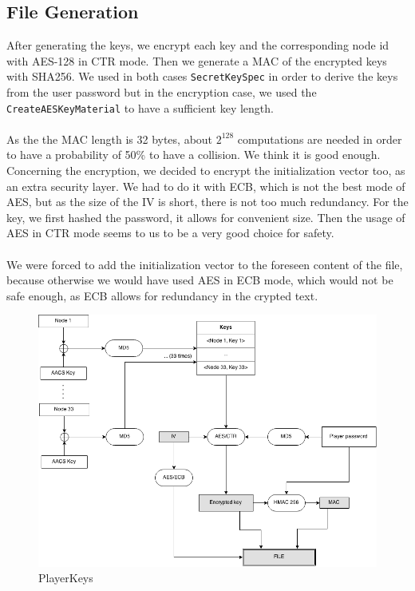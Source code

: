 \documentclass[a4paper,titlepage]{article}
\begin{document}
	\subsection{File Generation}
	After generating the keys, we encrypt each key and the corresponding node id with AES-128 in CTR mode. Then we generate a MAC of the encrypted keys with SHA256. We used in both cases \texttt{SecretKeySpec} in order to derive the keys from the user password but in the encryption case, we used the \texttt{CreateAESKeyMaterial} to have a sufficient key length. \\ \\ 
	As the the MAC length is 32 bytes, about $2^{128}$ computations are needed in order to have a probability of 50\% to have a collision. We think it is good enough. Concerning the encryption, we decided to encrypt the initialization vector too, as an extra security layer. We had to do it with ECB, which is not the best mode of AES, but as the size of the IV is short, there is not too much redundancy. For the key, we first hashed the password, it allows for convenient size. Then the usage of AES in CTR mode seems to us to be a very good choice for safety. \\ \\
	We were forced to add the initialization vector to the foreseen content of the file, because otherwise we would have used AES in ECB mode, which would not be safe enough, as ECB allows for redundancy in the crypted text.

\begin{figure}
	\centering
	\includegraphics[scale=0.5]{PlayerKeys.png}
	\caption{PlayerKeys}
	\label{PlayerKeys}
\end{figure}
\end{document}
